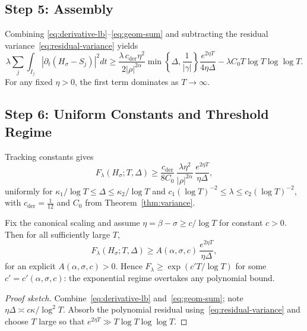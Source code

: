\subsection{Step 5: Assembly}\label{step:assembly}

Combining \eqref{eq:derivative-lb}–\eqref{eq:geom-sum} and
subtracting the residual variance~\eqref{eq:residual-variance} yields
\begin{equation}
\lambda\!\sum_j\!\int_{I_j}\!|\partial_t(H_\sigma-S_j)|^2dt
  \ge \frac{\lambda\,c_{\mathrm{der}}\eta^2}{2|\rho|^{2\alpha}}
        \min\!\left\{\!\Delta,\frac{1}{|\gamma|}\!\right\}
        \frac{e^{2\eta T}}{4\eta\Delta}
   - \lambda C_0 T\log T\log\log T.
\tag{8.5}\label{eq:assembly}
\end{equation}
For any fixed $\eta>0$, the first term dominates as $T\to\infty$.

\subsection{Step 6: Uniform Constants and Threshold Regime}\label{step:uniform}

Tracking constants gives
\begin{equation}
F_\lambda(H_\sigma;T,\Delta)
  \ge \frac{c_{\mathrm{der}}}{8C_0}\,
        \frac{\lambda\eta^2}{|\rho|^{2\alpha}}\,
        \frac{e^{2\eta T}}{\eta\Delta},
\tag{8.6}\label{eq:uniform-lb}
\end{equation}
uniformly for $\kappa_1/\log T \le \Delta \le \kappa_2/\log T$ and
$c_1(\log T)^{-2}\le \lambda \le c_2(\log T)^{-2}$,
with $c_{\mathrm{der}}=\tfrac1{12}$ and $C_0$ from Theorem~\ref{thm:variance}.

\begin{lemma}\label{lem:threshold}
Fix the canonical scaling and assume $\eta=\beta-\sigma\ge c/\log T$ for constant $c>0$.
Then for all sufficiently large $T$,
\[
F_\lambda(H_\sigma;T,\Delta)
   \ge A(\alpha,\sigma,c)\,\frac{e^{2\eta T}}{\eta\Delta},
\]
for an explicit $A(\alpha,\sigma,c)>0$.
Hence $F_\lambda\ge\exp(c' T/\log T)$ for some $c'=c'(\alpha,\sigma,c)$:
the exponential regime overtakes any polynomial bound.
\end{lemma}

\begin{proof}[Proof sketch]
Combine~\eqref{eq:derivative-lb} and~\eqref{eq:geom-sum}; note $\eta\Delta\asymp c\kappa/\log^2 T$.
Absorb the polynomial residual using~\eqref{eq:residual-variance}
and choose $T$ large so that $e^{2\eta T}\gg T\log T\log\log T$.
\end{proof}

